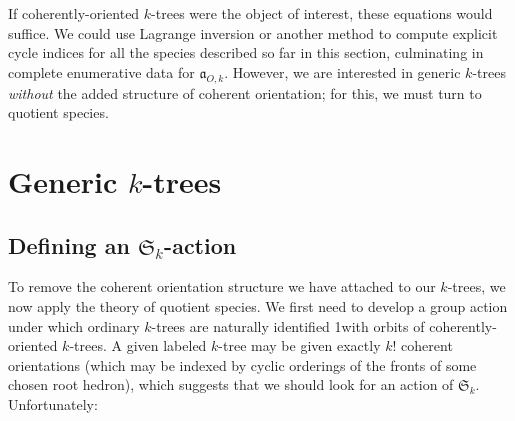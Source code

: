 \documentclass[sectionflow,singlespace,twoside]{brandiss} %
\numberwithin{section}{chapter}
\numberwithin{figure}{chapter}
\begin{document}
If coherently-oriented $k$-trees were the object of interest, these equations would suffice.
We could use Lagrange inversion or another method to compute explicit cycle indices for all the species described so far in this section, culminating in complete enumerative data for $\mathfrak{a}_{O, k}$.
However, we are interested in generic $k$-trees \emph{without} the added structure of coherent orientation; for this, we must turn to quotient species.

\section{Generic $k$-trees}
\subsection{Defining an $\mathfrak{S}_{k}$-action}\label{ss:saction}
To remove the coherent orientation structure we have attached to our $k$-trees, we now apply the theory of quotient species.
We first need to develop a group action under which ordinary $k$-trees are naturally identified 1with orbits of coherently-oriented $k$-trees.
A given labeled $k$-tree may be given exactly $k!$ coherent orientations (which may be indexed by cyclic orderings of the fronts of some chosen root hedron), which suggests that we should look for an action of $\mathfrak{S}_{k}$. Unfortunately:
\end{document}
